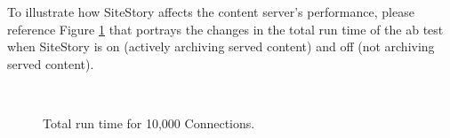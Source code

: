 \documentclass[runningheads,a4paper]{llncs}
\begin{document}
To illustrate how SiteStory affects the content server's performance, please reference Figure \ref{tares} 
that portrays the changes in the total run time of the ab test when SiteStory is on (actively archiving served content) and off (not archiving served content).

\begin{figure}[ht!]
  \begin{center}
     \\
  \end{center}
  \caption{Total run time for 10,000 Connections.}
  \label{tares}
\end{figure}


\end{document}
